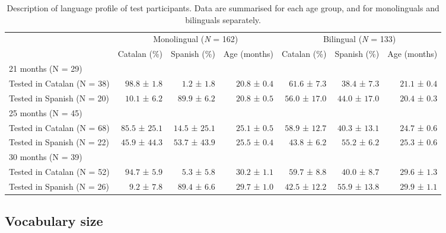 \documentclass[
  letterpaper,
  DIV=11,
  numbers=noendperiod]{scrartcl}
\begin{document}
\hypertarget{tbl-participants-lp}{}
\begin{longtable}{l|rrrrrr}
\caption{\label{tbl-participants-lp}Description of language profile of test participants. Data are
summarised for each age group, and for monolinguals and bilinguals
separately. }\tabularnewline

\toprule
\multicolumn{1}{l}{} & \multicolumn{3}{c}{Monolingual (\emph{N} = 162)} & \multicolumn{3}{c}{Bilingual (\emph{N} = 133)} \\ 
\cmidrule(lr){2-4} \cmidrule(lr){5-7}
\multicolumn{1}{l}{} & Catalan (\%) & Spanish (\%) & Age (months) & Catalan (\%) & Spanish (\%) & Age (months) \\ 
\midrule
\multicolumn{7}{l}{21 months (N = 29)} \\ 
\midrule
Tested in Catalan (N = 38) & $98.8$ ± $1.8$ & $1.2$ ± $1.8$ & $20.8$ ± $0.4$ & $61.6$ ± $7.3$ & $38.4$ ± $7.3$ & $21.1$ ± $0.4$ \\ 
Tested in Spanish (N = 20) & $10.1$ ± $6.2$ & $89.9$ ± $6.2$ & $20.8$ ± $0.5$ & $56.0$ ± $17.0$ & $44.0$ ± $17.0$ & $20.4$ ± $0.3$ \\ 
\midrule
\multicolumn{7}{l}{25 months (N = 45)} \\ 
\midrule
Tested in Catalan (N = 68) & $85.5$ ± $25.1$ & $14.5$ ± $25.1$ & $25.1$ ± $0.5$ & $58.9$ ± $12.7$ & $40.3$ ± $13.1$ & $24.7$ ± $0.6$ \\ 
Tested in Spanish (N = 22) & $45.9$ ± $44.3$ & $53.7$ ± $43.9$ & $25.5$ ± $0.4$ & $43.8$ ± $6.2$ & $55.2$ ± $6.2$ & $25.3$ ± $0.6$ \\ 
\midrule
\multicolumn{7}{l}{30 months (N = 39)} \\ 
\midrule
Tested in Catalan (N = 52) & $94.7$ ± $5.9$ & $5.3$ ± $5.8$ & $30.2$ ± $1.1$ & $59.7$ ± $8.8$ & $40.0$ ± $8.7$ & $29.6$ ± $1.3$ \\ 
Tested in Spanish (N = 26) & $9.2$ ± $7.8$ & $89.4$ ± $6.6$ & $29.7$ ± $1.0$ & $42.5$ ± $12.2$ & $55.9$ ± $13.8$ & $29.9$ ± $1.1$ \\ 
\bottomrule
\end{longtable}

\hypertarget{vocabulary-size}{%
\subsection{Vocabulary size}\label{vocabulary-size}}
\end{document}
